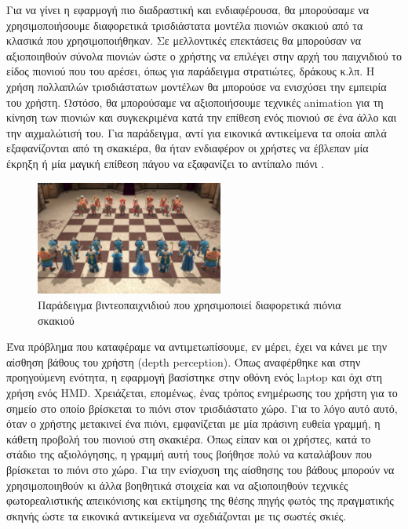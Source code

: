 Για να γίνει η εφαρμογή πιο διαδραστική και ενδιαφέρουσα, θα μπορούσαμε να χρησιμοποιήσουμε διαφορετικά τρισδιάστατα μοντέλα πιονιών σκακιού από τα κλασικά που χρησιμοποιήθηκαν. Σε μελλοντικές επεκτάσεις θα μπορούσαν να αξιοποιηθούν σύνολα πιονιών ώστε ο χρήστης να επιλέγει στην αρχή του παιχνιδιού το είδος πιονιού που του αρέσει, όπως για παράδειγμα στρατιώτες, δράκους κ.λπ.
Η χρήση πολλαπλών τρισδιάστατων μοντέλων θα μπορούσε να ενισχύσει την εμπειρία του χρήστη. Ωστόσο, θα μπορούσαμε να αξιοποιήσουμε τεχνικές animation για τη κίνηση των πιονιών και συγκεκριμένα κατά την επίθεση ενός πιονιού σε ένα άλλο και την αιχμαλώτισή του. Για παράδειγμα, αντί για εικονικά αντικείμενα τα οποία απλά εξαφανίζονται από τη σκακιέρα, θα ήταν ενδιαφέρον οι χρήστες να έβλεπαν μία έκρηξη ή μία μαγική επίθεση πάγου να εξαφανίζει το αντίπαλο πιόνι \cite{harrypotter}.


\begin{figure}[H]
    \centering
    \includegraphics[width=0.55\textwidth]{Files/Figures/soldiers.jpg}
    \caption[Παράδειγμα βιντεοπαιχνιδιού που χρησιμοποιεί διαφορετικά πιόνια σκακιού]{Παράδειγμα βιντεοπαιχνιδιού που χρησιμοποιεί διαφορετικά πιόνια σκακιού}
    \label{fig:markerboard_game}
\end{figure}





Ένα πρόβλημα που καταφέραμε να αντιμετωπίσουμε, εν μέρει, έχει να κάνει με την αίσθηση βάθους του χρήστη (depth perception). Όπως αναφέρθηκε και στην προηγούμενη ενότητα, η εφαρμογή βασίστηκε στην οθόνη ενός laptop και όχι στη χρήση ενός HMD. Χρειάζεται, επομένως, ένας τρόπος ενημέρωσης του χρήστη για το σημείο στο οποίο βρίσκεται το πιόνι στον τρισδιάστατο χώρο. Για το λόγο αυτό αυτό, όταν ο χρήστης μετακινεί ένα πιόνι, εμφανίζεται με μία πράσινη ευθεία γραμμή, η κάθετη προβολή του πιονιού στη σκακιέρα. Όπως είπαν και οι χρήστες, κατά το στάδιο της αξιολόγησης, η γραμμή αυτή τους βοήθησε πολύ να καταλάβουν που βρίσκεται το πιόνι στο χώρο. Για την ενίσχυση της αίσθησης του βάθους μπορούν να χρησιμοποιηθούν κι άλλα βοηθητικά στοιχεία και να αξιοποιηθούν τεχνικές φωτορεαλιστικής απεικόνισης και εκτίμησης της θέσης πηγής φωτός της πραγματικής σκηνής \cite{frahm2005markerless} \cite{agusanto2003photorealistic} ώστε τα εικονικά αντικείμενα να σχεδιάζονται με τις σωστές σκιές.


